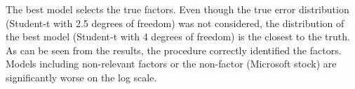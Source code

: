 The best model selects the true factors. 
Even though the true error distribution (Student-t with 2.5 degrees of freedom) was not considered, the distribution of the best model (Student-t with 4 degrees of freedom) is the closest to the truth. 
As can be seen from the results, the procedure correctly identified the factors. 
Models including non-relevant factors or the non-factor (Microsoft stock) are significantly worse on the log scale.
